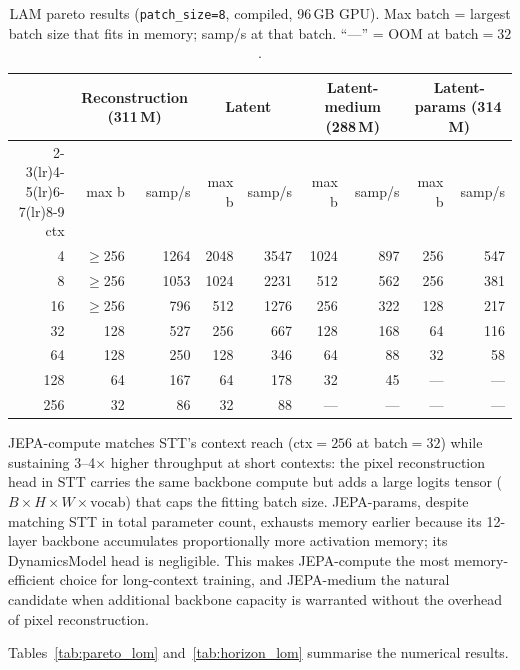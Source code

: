 \begin{table}[h]
\centering
\caption{LAM pareto results (\texttt{patch\_size=8}, compiled, 96\,GB GPU).
Max batch = largest batch size that fits in memory; samp/s at that batch.
``---'' = OOM at batch$=32$.}
\label{tab:pareto_lam}
\setlength{\tabcolsep}{4pt}
\begin{tabular}{r rr rr rr rr}
\toprule
 & \multicolumn{2}{c}{Reconstruction (311\,M)} & \multicolumn{2}{c}{Latent} & \multicolumn{2}{c}{Latent-medium (288\,M)} & \multicolumn{2}{c}{Latent-params (314\,M)} \\
\cmidrule(lr){2-3}\cmidrule(lr){4-5}\cmidrule(lr){6-7}\cmidrule(lr){8-9}
ctx & max b & samp/s & max b & samp/s & max b & samp/s & max b & samp/s \\
\midrule
  4 & $\ge$256 & 1264 & 2048 & 3547 & 1024 &  897 & 256 &  547 \\
  8 & $\ge$256 & 1053 & 1024 & 2231 &  512 &  562 & 256 &  381 \\
 16 & $\ge$256 &  796 &  512 & 1276 &  256 &  322 & 128 &  217 \\
 32 &  128 &  527 &  256 &  667 &  128 &  168 &  64 &  116 \\
 64 &  128 &  250 &  128 &  346 &   64 &   88 &  32 &   58 \\
128 &   64 &  167 &   64 &  178 &   32 &   45 & --- &  --- \\
256 &   32 &   86 &   32 &   88 &  --- &  --- & --- &  --- \\
\bottomrule
\end{tabular}
\end{table}

JEPA-compute matches STT's context reach (ctx$=256$ at batch$=32$) while
sustaining 3--4$\times$ higher throughput at short contexts: the pixel
reconstruction head in STT carries the same backbone compute but adds a
large logits tensor ($B \times H{\times}W \times \text{vocab}$) that caps
the fitting batch size.  JEPA-params, despite matching STT in total parameter
count, exhausts memory earlier because its 12-layer backbone accumulates
proportionally more activation memory; its DynamicsModel head is negligible.
This makes JEPA-compute the most memory-efficient choice for long-context
training, and JEPA-medium the natural candidate when additional backbone
capacity is warranted without the overhead of pixel reconstruction.

Tables~\ref{tab:pareto_lom} and~\ref{tab:horizon_lom} summarise the numerical results.


